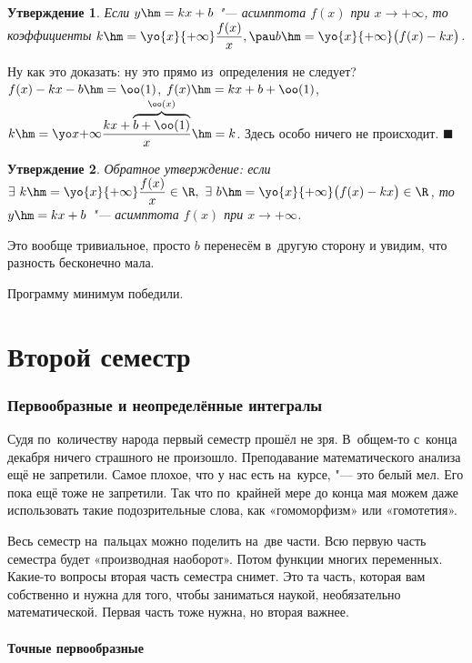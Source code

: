 \documentclass[a4paper,10pt,twoside]{article}
\newtheorem{Ut}{Утверждение}[section]
\newenvironment{Proof}
       {\par\noindent{\textbf{Доказательство.}}}
       {\hfill$\scriptstyle\blacksquare$}
\let\AVsection\section{}
\renewcommand\section{\newpage\scol\AVsection}
\let\AEpart\part{}
\renewcommand\part{\newpage\bezcol\AEpart}
\newcommand{\bezcol}{\renewcommand{\headrulewidth}{0pt}\fancyhead{}}
\newcommand{\scol}{  \renewcommand{\headrulewidth}{0.5pt}\fancyhead[RE,LO]{\thesection{} \leftmark} \fancyhead[LE,RO]{\thepage}}
\begin{document}
\begin{Ut}
  Если $y\hm=kx+b$ "--- асимптота $f(x)$ при $x\to+\infty$, то коэффициенты $k\hm=\yo{x}{+\infty}\dfrac{f(x)}x,\pau b\hm=\yo{x}{+\infty}\big(f(x)-kx\big)$.
\end{Ut}

\begin{Proof}
  Ну как это доказать: ну это прямо из~определения не следует? $f(x)-kx-b\hm=\oo(1)$, $f(x)\hm=kx+b+\oo(1)$, $k\hm=\yo x{+\infty}\dfrac{kx+\overbrace{b+\oo(1)}^{\oo(x)}}x\hm=k$. Здесь
  особо ничего не происходит.
\end{Proof}

\begin{Ut}
  Обратное утверждение: если $\exists\  k\hm=\yo{x}{+\infty}\dfrac{f(x)}x\in\R,\ \exists\  b\hm=\yo{x}{+\infty}\big(f(x)-kx\big)\in\R$, то
  $y\hm=kx+b$ "--- асимптота $f(x)$ при $x\to+\infty$.
\end{Ut}

Это вообще тривиальное, просто $b$ перенесём в~другую сторону и увидим, что разность бесконечно мала.

Программу минимум победили.
    \part{Второй семестр}

    
 \section{Первообразные и неопределённые интегралы}

Судя по~количеству народа первый семестр прошёл не зря. В~общем-то с~конца декабря ничего страшного не произошло. Преподавание математического анализа
ещё не запретили. Самое плохое, что у нас есть на~курсе, "--- это белый мел. Его пока ещё тоже не запретили. Так что по~крайней мере до конца мая можем
даже использовать такие подозрительные слова, как «гомоморфизм» или «гомотетия».

Весь семестр на~пальцах можно поделить на~две части. Всю первую часть семестра будет «производная наоборот». Потом функции многих переменных. Какие-то вопросы вторая часть семестра снимет. Это та часть, которая вам собственно и нужна для того, чтобы заниматься наукой, необязательно математической.
Первая часть тоже нужна, но вторая важнее.

\subsection{Точные первообразные}
\end{document}
